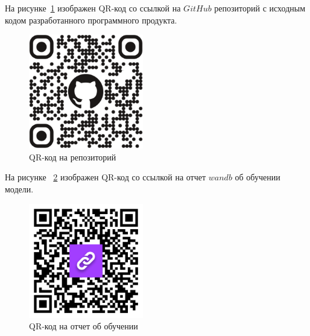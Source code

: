 
На рисунке~\ref{qr_git} изображен QR-код со ссылкой на $GitHub$ репозиторий с исходным кодом разработанного программного продукта.

\begin{figure}
    \includegraphics[width=5cm]{img/qr_git.png}
    \caption{QR-код на репозиторий}
    \label{qr_git}
\end{figure}

На рисунке ~\ref{wandb_qr} изображен QR-код со ссылкой на отчет $wandb$ об обучении модели.

\begin{figure}
    \includegraphics[width=5cm]{img/qr_wandb.png}
    \caption{QR-код на отчет об обучении}
    \label{wandb_qr}
\end{figure}